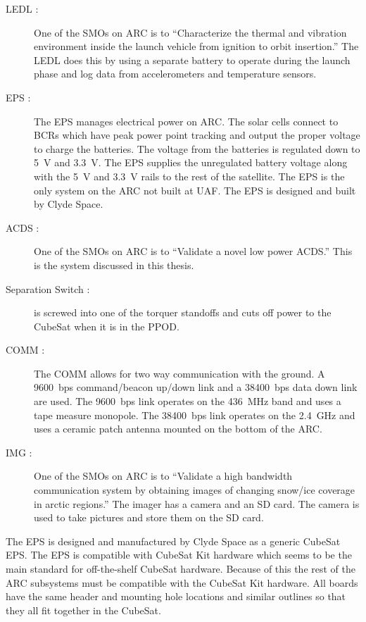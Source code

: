 \begin{description}
    \item[\acs{LEDL} :] One of the \acp{SMO} on \ac{ARC} is to ``Characterize the thermal and vibration environment inside the launch vehicle from ignition to orbit insertion.''\cite{ARCweb} The \ac{LEDL} does this by using a separate battery to operate during the launch phase and log data from accelerometers and temperature sensors.
    \item[\acs{EPS} :] The \ac{EPS} manages electrical power on \ac{ARC}. The solar cells connect to \acp{BCR} which have peak power point tracking and output the proper voltage to charge the batteries. The voltage from the batteries is regulated down to 5~V and 3.3~V. The \ac{EPS} supplies the unregulated battery voltage along with the 5~V and 3.3~V rails to the rest of the satellite. The \ac{EPS} is the only system on the \ac{ARC} not built at UAF. The \ac{EPS} is designed and built by Clyde Space.
    \item[\acs{ACDS} :] One of the \acp{SMO} on \ac{ARC} is to ``Validate a novel low power \acf{ACDS}.'' \cite{ARCweb} This is the system discussed in this thesis.
    \item[Separation Switch :] is screwed into one of the torquer standoffs and cuts off power to the CubeSat when it is in the \ac{PPOD}.
    \item[\acs{COMM} :] The \ac{COMM} allows for two way communication with the ground. A 9600~bps command/beacon up/down link and a 38400~bps data down link are used. The 9600~bps link operates on the 436~MHz band and uses a tape measure monopole. The 38400~bps link operates on the 2.4~GHz and uses a ceramic patch antenna mounted on the bottom of the \ac{ARC}.
    \item[\acs{IMG} :] One of the \acp{SMO} on \ac{ARC} is to ``Validate a high bandwidth communication system by obtaining images of changing snow/ice coverage in arctic regions.''\cite{ARCweb} The imager has a camera and an SD card. The camera is used to take pictures and store them on the SD card.
\end{description}

The \ac{EPS} is designed and manufactured by Clyde Space as a generic CubeSat \ac{EPS}. The \ac{EPS} is compatible with CubeSat Kit\cite{CSK} hardware which seems to be the main standard for off-the-shelf CubeSat hardware. Because of this the rest of the \ac{ARC} subsystems must be compatible with the CubeSat Kit hardware. All boards have the same header and mounting hole locations and similar outlines so that they all fit together in the CubeSat.

